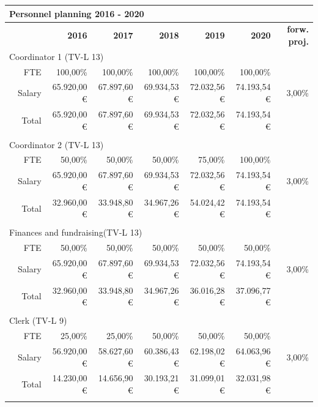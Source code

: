 \documentclass[nonflat,smallfont
]{langsci/langscibook}
\begin{document}
{{\begin{tabular}{lrrrrrrr}
\multicolumn{5}{l}{ \textbf{{Personnel planning 2016} - 2020}}\\
\midrule
& & \textbf{2016} & \textbf{2017} & \textbf{2018} & \textbf{2019} & \textbf{2020} & \textbf{forw. proj.}\\
\midrule 
\multicolumn{5}{l}{ Coordinator 1 (TV-L 13)}\\
\midrule
&  FTE &  100,00\% &  100,00\% &  100,00\% &  100,00\% &  100,00\% & ~\\
&  Salary &  65.920,00 € &  67.897,60 € &  69.934,53 € &  72.032,56 € &  74.193,54 € &  3,00\%\\
 &  Total &  65.920,00 € &  67.897,60 € &  69.934,53 € &  72.032,56 € &  74.193,54 € & ~\\
\\
\multicolumn{5}{l}{ Coordinator 2 (TV-L 13)}\\
\midrule
&  FTE &  50,00\% &  50,00\% &  50,00\% &  75,00\% &  100,00\% & ~\\
&  Salary &  65.920,00 € &  67.897,60 € &  69.934,53 € &  72.032,56 € &  74.193,54 € &  3,00\%\\
 &  Total &  32.960,00 € &  33.948,80 € &  34.967,26 € &  54.024,42 € &  74.193,54 € & ~\\
\\
\multicolumn{5}{l}{ Finances and fundraising(TV-L 13)}\\
\midrule
&  FTE &  50,00\% &  50,00\% &  50,00\% &  50,00\% &  50,00\% & ~\\
&  Salary &  65.920,00 € &  67.897,60 € &  69.934,53 € &  72.032,56 € &  74.193,54 € &  3,00\%\\
 &  Total &  32.960,00 € &  33.948,80 € &  34.967,26 € &  36.016,28 € &  37.096,77 € & ~\\
\\
\multicolumn{5}{l}{ Clerk (TV-L 9)}\\
\midrule
&  FTE &  25,00\% &  25,00\% &  50,00\% &  50,00\% &  50,00\% & ~\\
&  Salary &  56.920,00 € &  58.627,60 € &  60.386,43 € &  62.198,02 € &  64.063,96 € &  3,00\%\\
 &  Total &  14.230,00 € &  14.656,90 € &  30.193,21 € &  31.099,01 € &  32.031,98 € & ~\\
\\
\end{tabular}
}
\noindent
{}}
\end{document}
